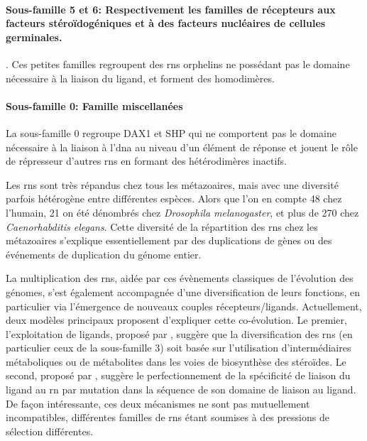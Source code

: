 \paragraph{Sous-famille 5 et 6: Respectivement les familles de récepteurs aux facteurs stéroïdogéniques et à des facteurs nucléaires de cellules germinales.}.
Ces petites familles regroupent des \glspl{rn} orphelins ne possédant pas le domaine nécessaire à la liaison du ligand, et forment des homodimères.

\paragraph{Sous-famille 0: Famille miscellanées}
La sous-famille 0 regroupe DAX1 et SHP qui ne comportent pas le domaine nécessaire à la liaison à l'\gls{dna} au niveau d'un élément de réponse et jouent le rôle de répresseur d'autres \glspl{rn} en formant des hétérodimères inactifs.
\par

Les \glspl{rn} sont très répandus chez tous les métazoaires, mais avec une diversité parfois hétérogène entre différentes espèces.
Alors que l'on en compte 48 chez l'humain, 21 on été dénombrés chez \textit{Drosophila melanogaster}, et plus de 270 chez \textit{Caenorhabditis elegans}.
Cette diversité de la répartition des \glspl{rn} chez les métazoaires s'explique essentiellement par des duplications de gènes ou des événements de duplication du génome entier.

La multiplication des \glspl{rn}, aidée par ces évènements classiques de l'évolution des génomes, s'est également accompagnée d'une diversification de leurs fonctions, en particulier via l'émergence de nouveaux couples récepteurs/ligands.
Actuellement, deux modèles principaux proposent d'expliquer cette co-évolution.
Le premier, l'exploitation de ligands, proposé par \citet{Thornton2001}, suggère que la diversification des \glspl{rn} (en particulier ceux de la sous-famille 3) soit basée sur l'utilisation d'intermédiaires métaboliques ou de métabolites dans les voies de biosynthèse des stéroïdes.
Le second, proposé par \citet{Escriva2006}, suggère le perfectionnement de la spécificité de liaison du ligand au \gls{rn} par mutation dans la séquence de son domaine de liaison au ligand.
De façon intéressante, ces deux mécanismes ne sont pas mutuellement incompatibles, différentes familles de \glspl{rn} étant soumises à des pressions de sélection différentes.


